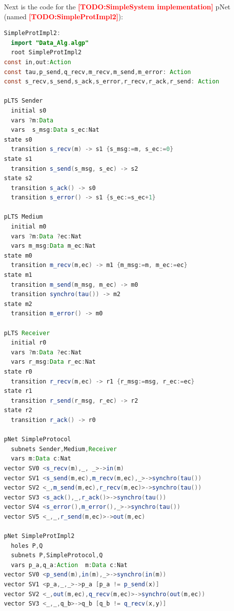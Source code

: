 \documentclass{lmcs}
\newcommand{\TODO}[1]{\textcolor{red}{\textbf{[TODO:#1]}}}
\begin{document}
Next is the code for the \TODO{SimpleSystem implementation} pNet (named \TODO{SimpleProtImpl2}):
\medskip
\begin{lstlisting}[basicstyle=\scriptsize\ttfamily, language=java, frame=single]
SimpleProtImpl2:
  import "Data_Alg.algp"
  root SimpleProtImpl2
const in,out:Action
const tau,p_send,q_recv,m_recv,m_send,m_error: Action
const s_recv,s_send,s_ack,s_error,r_recv,r_ack,r_send: Action

pLTS Sender
  initial s0
  vars ?m:Data
  vars  s_msg:Data s_ec:Nat
state s0
  transition s_recv(m) -> s1 {s_msg:=m, s_ec:=0}
state s1
  transition s_send(s_msg, s_ec) -> s2 
state s2
  transition s_ack() -> s0
  transition s_error() -> s1 {s_ec:=s_ec+1}

pLTS Medium
  initial m0
  vars ?m:Data ?ec:Nat
  vars m_msg:Data m_ec:Nat
state m0
  transition m_recv(m,ec) -> m1 {m_msg:=m, m_ec:=ec}
state m1
  transition m_send(m_msg, m_ec) -> m0 
  transition synchro(tau()) -> m2
state m2
  transition m_error() -> m0

pLTS Receiver
  initial r0
  vars ?m:Data ?ec:Nat
  vars r_msg:Data r_ec:Nat
state r0
  transition r_recv(m,ec) -> r1 {r_msg:=msg, r_ec:=ec}
state r1
  transition r_send(r_msg, r_ec) -> r2
state r2
  transition r_ack() -> r0

pNet SimpleProtocol
  subnets Sender,Medium,Receiver
  vars m:Data c:Nat
vector SV0 <s_recv(m),_, _>->in(m)
vector SV1 <s_send(m,ec),m_recv(m,ec),_>->synchro(tau())
vector SV2 <_,m_send(m,ec),r_recv(m,ec)>->synchro(tau())
vector SV3 <s_ack(),_,r_ack()>->synchro(tau())
vector SV4 <s_error(),m_error(),_>->synchro(tau())
vector SV5 <_,_,r_send(m,ec)>->out(m,ec)

pNet SimpleProtImpl2
  holes P,Q
  subnets P,SimpleProtocol,Q
  vars p_a,q_a:Action  m:Data c:Nat
vector SV0 <p_send(m),in(m),_>->synchro(in(m))
vector SV1 <p_a,_,_>->p_a [p_a != p_send(x)]
vector SV2 <_,out(m,ec),q_recv(m,ec)>->synchro(out(m,ec))
vector SV3 <_,_,q_b>->q_b [q_b != q_recv(x,y)]
\end{lstlisting}

\end{document}
